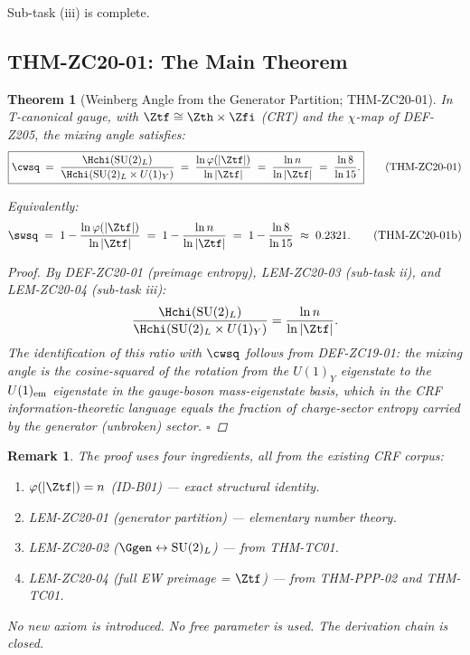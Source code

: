\documentclass[12pt, a4paper]{article}
\newtheorem{theorem}{Theorem}[section]
\newtheorem{remark}{Remark}[section]
\begin{document}
Sub-task (iii) is complete.

\subsection{THM-ZC20-01: The Main Theorem}
\label{zc20:sec:theorem}

\begin{theorem}[Weinberg Angle from the Generator Partition;
  THM-ZC20-01]
\label{zc20:thm:main}
In T-canonical gauge, with $\Ztf \cong \Zth\times\Zfi$ (CRT)
and the $\chi$-map of DEF-Z205, the mixing angle satisfies:
\begin{equation}
  \boxed{%
    \cwsq
    \;=\; \frac{\Hchi(\mathrm{SU}(2)_L)}
               {\Hchi(\mathrm{SU}(2)_L\times U(1)_Y)}
    \;=\; \frac{\ln\varphi(|\Ztf|)}{\ln|\Ztf|}
    \;=\; \frac{\ln n}{\ln|\Ztf|}
    \;=\; \frac{\ln 8}{\ln 15}.
  }
  \tag{THM-ZC20-01}
\end{equation}

Equivalently:
\begin{equation}
  \swsq
  \;=\; 1 - \frac{\ln\varphi(|\Ztf|)}{\ln|\Ztf|}
  \;=\; 1 - \frac{\ln n}{\ln|\Ztf|}
  \;=\; 1 - \frac{\ln 8}{\ln 15}
  \;\approx\; 0.2321.
  \tag{THM-ZC20-01b}
\end{equation}

\begin{proof}
By DEF-ZC20-01 (preimage entropy), LEM-ZC20-03 (sub-task ii),
and LEM-ZC20-04 (sub-task iii):
\[
  \frac{\Hchi(\mathrm{SU}(2)_L)}
       {\Hchi(\mathrm{SU}(2)_L\times U(1)_Y)}
  = \frac{\ln n}{\ln|\Ztf|}.
\]
The identification of this ratio with $\cwsq$ follows from
DEF-ZC19-01: the mixing angle is the cosine-squared of the
rotation from the $U(1)_Y$ eigenstate to the $U(1)_{\rm em}$
eigenstate in the gauge-boson mass-eigenstate basis,
which in the CRF information-theoretic language equals the
fraction of charge-sector entropy carried by the generator
(unbroken) sector. \hfill$\square$
\end{proof}
\end{theorem}

\begin{remark}
The proof uses four ingredients, all from the existing CRF corpus:
\begin{enumerate}[leftmargin=*, noitemsep]
  \item $\varphi(|\Ztf|) = n$ (ID-B01) --- exact structural identity.
  \item LEM-ZC20-01 (generator partition) --- elementary number theory.
  \item LEM-ZC20-02 ($\Ggen \leftrightarrow \mathrm{SU}(2)_L$) --- from THM-TC01.
  \item LEM-ZC20-04 (full EW preimage = $\Ztf$) --- from THM-PPP-02 and THM-TC01.
\end{enumerate}
No new axiom is introduced. No free parameter is used.
The derivation chain is closed.
\end{remark}
\end{document}
